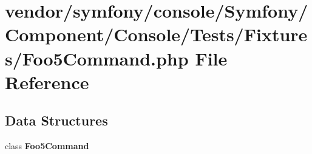 \section{vendor/symfony/console/\+Symfony/\+Component/\+Console/\+Tests/\+Fixtures/\+Foo5\+Command.php File Reference}
\label{_foo5_command_8php}
\subsection*{Data Structures}
\begin{DoxyCompactItemize}
\item 
class {\bf Foo5\+Command}
\end{DoxyCompactItemize}
